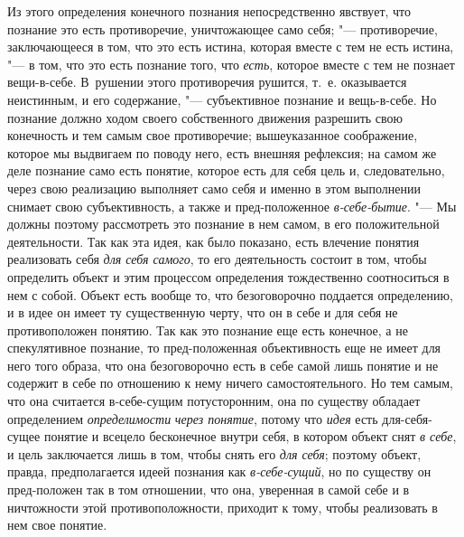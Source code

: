 {{Из этого определения конечного познания непосредственно
явствует, что познание это есть противоречие, уничтожающее само себя;
"--- противоречие, заключающееся в том, что это есть истина,
которая вместе с тем не есть истина, "--- в том, что это есть
познание того, что {\em есть},
которое вместе с тем не познает вещи-в-себе. В~рушении этого
противоречия рушится, т.~е. оказывается неистинным, и его содержание, "---
субъективное познание и вещь-в-себе. Но познание должно ходом
своего собственного движения разрешить свою конечность и тем самым свое
противоречие; вышеуказанное соображение, которое мы выдвигаем по поводу
него, есть внешняя рефлексия; на самом же деле познание само есть понятие,
которое есть для себя цель и, следовательно, через свою реализацию
выполняет само себя и именно в этом выполнении снимает свою субъективность,
а также и пред-положенное
{\em в-себе-бытие}.
"--- Мы должны поэтому рассмотреть это познание в нем самом, в
его положительной деятельности. Так как эта идея, как было показано, есть
влечение понятия реализовать себя
{\em для себя самого}, то
его деятельность состоит в том, чтобы определить объект и этим процессом
определения тождественно соотноситься в нем с собой. Объект есть вообще то,
что безоговорочно поддается определению, и в идее он имеет ту существенную
черту, что он в себе и для себя не противоположен понятию. Так как это
познание еще есть конечное, а не спекулятивное познание, то пред-положенная
объективность еще не имеет для него того образа, что она безоговорочно есть
в себе самой лишь понятие и не содержит в себе по отношению к нему ничего
самостоятельного. Но тем самым, что она считается в-себе-сущим
потусторонним, она по существу обладает определением
{\em определимости}
{\em через понятие},
потому что {\em идея}
есть для-себя-сущее понятие и всецело бесконечное внутри
себя, в котором объект снят {\em в
себе}, и цель заключается лишь в том, чтобы снять его
{\em для себя}; поэтому
объект, правда, предполагается идеей познания как
{\em в-себе-сущий}, но по
существу он пред-положен так в том отношении, что она,
уверенная в самой себе и в ничтожности этой
противоположности, приходит к тому, чтобы реализовать в нем свое понятие.

}}
